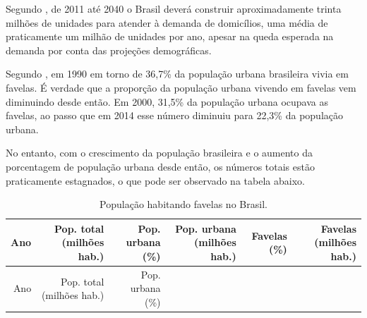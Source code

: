 \documentclass[
	12pt,				%
	oneside,			%
	a4paper,			%
	chapter=TITLE,		%
	section=TITLE,		%
	english,			%
	brazil				%
	]{abntex2}
\begin{document}
\begin{refsection}
Segundo \textcite[p.~7]{demanda}, de 2011 até 2040 o Brasil deverá construir
aproximadamente trinta milhões de unidades para atender à demanda de domicílios,
uma média de praticamente um milhão de unidades por ano, apesar na queda
esperada na demanda por conta das projeções demográficas.

Segundo \textcite{ritchie_urbanization_2018}, em 1990 em torno de 36,7\% da população
urbana brasileira vivia em favelas. É verdade que a proporção da população
urbana vivendo em favelas vem diminuindo desde então. Em 2000, 31,5\% da
população urbana ocupava as favelas, ao passo que em 2014 esse número diminuiu
para 22,3\% da população urbana.

No entanto, com o crescimento da população brasileira e o aumento da porcentagem
de população urbana desde então, os números totais estão praticamente estagnados,
o que pode ser observado na tabela abaixo.
\begin{longtable}[]{@{}rrrrrr@{}}
\caption{População habitando favelas no Brasil.}\tabularnewline
\toprule
\begin{minipage}[b]{0.04\columnwidth}\raggedleft
Ano\strut
\end{minipage} & \begin{minipage}[b]{0.20\columnwidth}\raggedleft
Pop. total (milhões hab.)\strut
\end{minipage} & \begin{minipage}[b]{0.13\columnwidth}\raggedleft
Pop. urbana (\%)\strut
\end{minipage} & \begin{minipage}[b]{0.21\columnwidth}\raggedleft
Pop. urbana (milhões hab.)\strut
\end{minipage} & \begin{minipage}[b]{0.10\columnwidth}\raggedleft
Favelas (\%)\strut
\end{minipage} & \begin{minipage}[b]{0.17\columnwidth}\raggedleft
Favelas (milhões hab.)\strut
\end{minipage}\tabularnewline
\midrule
\endfirsthead
\toprule
\begin{minipage}[b]{0.04\columnwidth}\raggedleft
Ano\strut
\end{minipage} & \begin{minipage}[b]{0.20\columnwidth}\raggedleft
Pop. total (milhões hab.)\strut
\end{minipage} & \begin{minipage}[b]{0.13\columnwidth}\raggedleft
Pop. urbana (\%)\strut
\end{minipage} & \begin{minipage}[b]{0.21\columnwidth}\raggedleft

\end{minipage}
\end{longtable}
\end{refsection}
\end{document}
